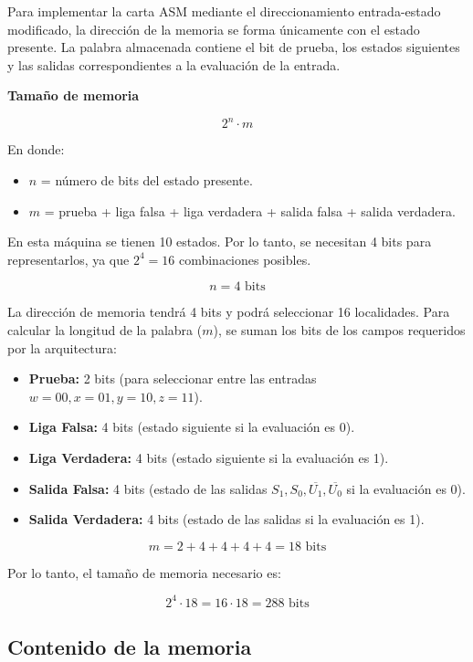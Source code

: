 \documentclass[12pt, letterpaper]{article}
\begin{document}
Para implementar la carta ASM mediante el direccionamiento entrada-estado modificado, la dirección de la memoria se forma únicamente con el estado presente. La palabra almacenada contiene el bit de prueba, los estados siguientes y las salidas correspondientes a la evaluación de la entrada.

\textbf{Tamaño de memoria}

\[
2^n \cdot m
\]

En donde:
\begin{itemize}
    \item $n$ = número de bits del estado presente.
    \item $m$ = prueba + liga falsa + liga verdadera + salida falsa + salida verdadera.
\end{itemize}

En esta máquina se tienen 10 estados. Por lo tanto, se necesitan 4 bits para representarlos, ya que $2^4=16$ combinaciones posibles.

\[
n = 4\text{ bits}
\]

La dirección de memoria tendrá 4 bits y podrá seleccionar 16 localidades. Para calcular la longitud de la palabra ($m$), se suman los bits de los campos requeridos por la arquitectura:

\begin{itemize}
    \item \textbf{Prueba:} 2 bits (para seleccionar entre las entradas $w=00, x=01, y=10, z=11$).
    \item \textbf{Liga Falsa:} 4 bits (estado siguiente si la evaluación es 0).
    \item \textbf{Liga Verdadera:} 4 bits (estado siguiente si la evaluación es 1).
    \item \textbf{Salida Falsa:} 4 bits (estado de las salidas $S_1, S_0, \overline{U_1}, \overline{U_0}$ si la evaluación es 0).
    \item \textbf{Salida Verdadera:} 4 bits (estado de las salidas si la evaluación es 1).
\end{itemize}

\[
m = 2 + 4 + 4 + 4 + 4 = 18\text{ bits}
\]

Por lo tanto, el tamaño de memoria necesario es:

\begin{tcolorbox}[colback=gray!20,colframe=LimeGreen!75!black]
\[
2^4\cdot 18 = 16\cdot 18 = 288\text{ bits}
\]
\end{tcolorbox}

\subsection*{Contenido de la memoria}
\end{document}
